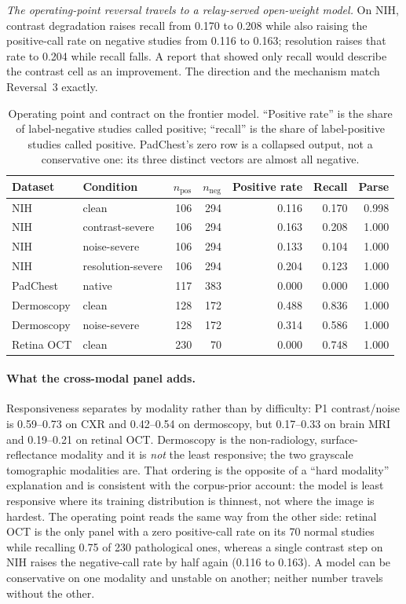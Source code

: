 \emph{The operating-point reversal travels to a relay-served open-weight model.} On NIH, contrast
degradation raises recall from 0.170 to 0.208 while also raising the positive-call
rate on negative studies from 0.116 to 0.163; resolution raises that rate to
0.204 while recall falls. A report that showed only recall would describe the
contrast cell as an improvement. The direction and the mechanism match
Reversal~3 exactly.

\begin{table}[t]
\centering
\small
\caption{Operating point and contract on the frontier model. ``Positive rate''
is the share of label-negative studies called positive; ``recall'' is the share of
label-positive studies called positive. PadChest's zero row is a collapsed output,
not a conservative one: its three distinct vectors are almost all negative.}
\label{tab:api-op}
\begin{tabular}{llrrrrr}
\toprule
Dataset & Condition & $n_{\text{pos}}$ & $n_{\text{neg}}$ & Positive rate & Recall & Parse \\
\midrule
NIH        & clean             & 106 & 294 & 0.116 & 0.170 & 0.998 \\
NIH        & contrast-severe   & 106 & 294 & 0.163 & 0.208 & 1.000 \\
NIH        & noise-severe      & 106 & 294 & 0.133 & 0.104 & 1.000 \\
NIH        & resolution-severe & 106 & 294 & 0.204 & 0.123 & 1.000 \\
PadChest   & native            & 117 & 383 & 0.000 & 0.000 & 1.000 \\
Dermoscopy & clean             & 128 & 172 & 0.488 & 0.836 & 1.000 \\
Dermoscopy & noise-severe      & 128 & 172 & 0.314 & 0.586 & 1.000 \\
Retina OCT & clean             & 230 &  70 & 0.000 & 0.748 & 1.000 \\
\bottomrule
\end{tabular}
\end{table}

\paragraph{What the cross-modal panel adds.} Responsiveness separates by modality
rather than by difficulty: P1 contrast/noise is 0.59--0.73 on CXR and 0.42--0.54
on dermoscopy, but 0.17--0.33 on brain MRI and 0.19--0.21 on retinal OCT. Dermoscopy is the
non-radiology, surface-reflectance modality and it is \emph{not} the least
responsive; the two grayscale tomographic modalities are. That ordering is the opposite of a ``hard modality'' explanation
and is consistent with the corpus-prior account: the model is least responsive
where its training distribution is thinnest, not where the image is hardest.
The operating point reads the same way from the other side: retinal OCT is the
only panel with a zero positive-call rate on its 70 normal studies while
recalling 0.75 of 230 pathological ones, whereas a single contrast step on NIH
raises the negative-call rate by half again (0.116 to 0.163). A model can be
conservative on one modality and unstable on another; neither number travels
without the other.

